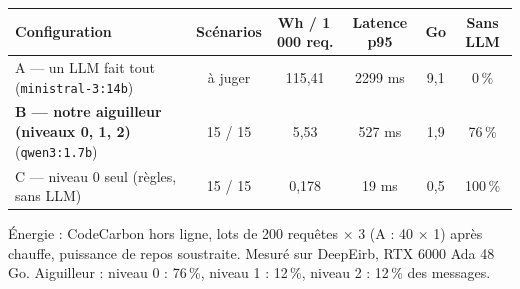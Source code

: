 \scriptsize
\begin{tabularx}{\textwidth}{@{}Y c c c c c@{}}
\toprule
\textbf{Configuration} & \textbf{Scénarios} & \textbf{Wh / 1\,000 req.} & \textbf{Latence p95} & \textbf{Go} & \textbf{Sans LLM} \\
\midrule
A --- un LLM fait tout (\texttt{ministral-3:14b}) & à juger & 115,41 & 2299 ms & 9,1 & 0\,\% \\
\textbf{B --- notre aiguilleur (niveaux 0, 1, 2)} (\texttt{qwen3:1.7b}) & 15 / 15 & 5,53 & 527 ms & 1,9 & 76\,\% \\
C --- niveau 0 seul (règles, sans LLM) & 15 / 15 & 0,178 & 19 ms & 0,5 & 100\,\% \\
\bottomrule
\end{tabularx}

\smallskip
{\tiny Énergie : CodeCarbon hors ligne, lots de 200 requêtes × 3 (A : 40 × 1) après chauffe, puissance de repos soustraite. Mesuré sur DeepEirb, RTX 6000 Ada 48 Go. Aiguilleur : niveau 0 : 76\,\%, niveau 1 : 12\,\%, niveau 2 : 12\,\% des messages.}
